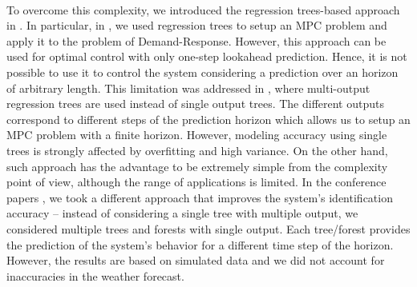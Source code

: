 {\\
To overcome this complexity, we introduced the regression trees-based approach in \cite{Behl2016,Jain2017TCPS}. 
In particular, in \cite{Behl2016}, we used regression trees to setup an MPC problem and apply it to the problem of Demand-Response. 
However, this approach can be used for optimal control with only one-step lookahead prediction.
Hence, it is not possible to use it to control the system considering a prediction over an horizon of arbitrary length. 
This limitation was addressed in \cite{Jain2017TCPS}, where multi-output regression trees are used instead of single output trees. 
The different outputs correspond to different steps of the prediction horizon which allows us to setup an MPC problem with a finite horizon. 
However, modeling accuracy using single trees is strongly affected by overfitting and high variance. 
On the other hand, such approach has the advantage to be extremely simple from the complexity point of view, although the range of applications is limited. 
In the conference papers \cite{JainACC2017,JainCDC2017}, we took a different approach that improves the system's identification accuracy -- instead of considering a single tree with multiple output, we considered multiple trees and forests with single output. 
Each tree/forest provides the prediction of the system's behavior for a different time step of the horizon. 
However, the results are based on simulated data and we did not account for inaccuracies in the weather forecast.
}





